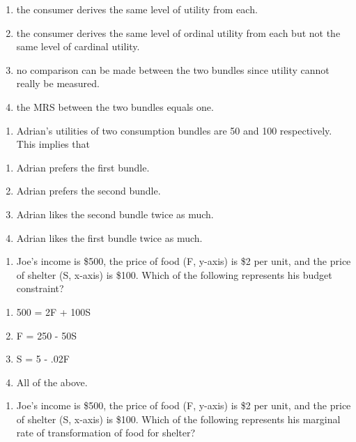 \documentclass[11pt,]{article}
\providecommand{\tightlist}{%
  \setlength{\itemsep}{0pt}\setlength{\parskip}{0pt}}
\begin{document}
\begin{enumerate}
\def\labelenumi{\Alph{enumi})}
\tightlist
\item
  the consumer derives the same level of utility from each.
\item
  the consumer derives the same level of ordinal utility from each but
  not the same level of cardinal utility.
\item
  no comparison can be made between the two bundles since utility cannot
  really be measured.
\item
  the MRS between the two bundles equals one.
\end{enumerate}

\begin{enumerate}
\def\labelenumi{\arabic{enumi})}
\setcounter{enumi}{12}
\tightlist
\item
  Adrian's utilities of two consumption bundles are 50 and 100
  respectively. This implies that
\end{enumerate}

\begin{enumerate}
\def\labelenumi{\Alph{enumi})}
\tightlist
\item
  Adrian prefers the first bundle.
\item
  Adrian prefers the second bundle.
\item
  Adrian likes the second bundle twice as much.
\item
  Adrian likes the first bundle twice as much.
\end{enumerate}

\newpage

\begin{enumerate}
\def\labelenumi{\arabic{enumi})}
\setcounter{enumi}{13}
\tightlist
\item
  Joe's income is \$500, the price of food (F, y-axis) is \$2 per unit,
  and the price of shelter (S, x-axis) is \$100. Which of the following
  represents his budget constraint?
\end{enumerate}

\begin{enumerate}
\def\labelenumi{\Alph{enumi})}
\tightlist
\item
  500 = 2F + 100S
\item
  F = 250 - 50S
\item
  S = 5 - .02F
\item
  All of the above.
\end{enumerate}

\begin{enumerate}
\def\labelenumi{\arabic{enumi})}
\setcounter{enumi}{14}
\tightlist
\item
  Joe's income is \$500, the price of food (F, y-axis) is \$2 per unit,
  and the price of shelter (S, x-axis) is \$100. Which of the following
  represents his marginal rate of transformation of food for shelter?
\end{enumerate}
\end{document}
